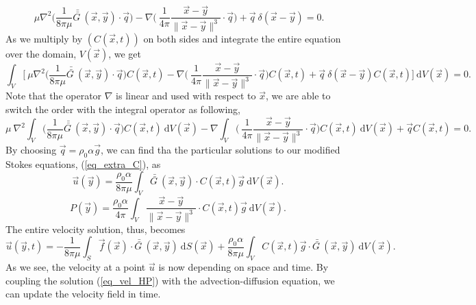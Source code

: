 \begin{equation}
	\ \mu \nabla^2 
	\biggl( \frac{1}{8\pi \mu}  \bar{\bar{G \ }}(\vec{x}, \vec{y})
	\cdot  \vec{q} \biggr)
	- \nabla \biggl(\ \frac{1}{4\pi }  
	\frac{\vec{x} - \vec{y}}{\| \vec{x} - \vec{y}\|^3}
	\cdot  \vec{q} \biggr)
	+ \vec{q} \ \delta \left(\vec{x} - \vec{y} \right)
	=0 .
\label{eq_single_stokes_sub}
\end{equation}
As we multiply by $\left( C(\vec{x}, t) \right)$ on both sides and integrate the entire equation over the domain, $V(\vec{x})$, we get
\begin{equation}
	\int_{V}
	\biggl[
	\ \mu \nabla^2 
	\biggl( \frac{1}{8\pi \mu}  \bar{\bar{G \ }}(\vec{x}, \vec{y})
	\cdot  \vec{q} \biggr)
	C(\vec{x}, t)
	-
	\nabla \biggl(\ \frac{1}{4\pi }  
	\frac{\vec{x} - \vec{y}}{\| \vec{x} - \vec{y}\|^3}
	\cdot  \vec{q} \biggr)
	C(\vec{x}, t)
	+ \vec{q} \ \delta \left(\vec{x} - \vec{y} \right)
	C(\vec{x}, t)
	\biggr]
	\ \textrm{d}V(\vec{x}) = 0 .
\label{eq_single_stokes_sub2}
\end{equation}
Note that the operator $\nabla$ is linear and used with respect to $\vec{x}$, we are able to switch the order with the integral operator as following,
\begin{equation}
	\mu \ \nabla^2 
	\int_{V}
	\biggl( \frac{1}{8\pi \mu}  \bar{\bar{G \ }}(\vec{x}, \vec{y})
	\cdot  \vec{q} \biggr)
	C(\vec{x}, t)
	\ \textrm{d}V(\vec{x})
	-
	\nabla 
	\int_{V}
	\biggl(\ \frac{1}{4\pi }  
	\frac{\vec{x} - \vec{y}}{\| \vec{x} - \vec{y}\|^3}
	\cdot  \vec{q} \biggr)
	C(\vec{x}, t)
	\ \textrm{d}V(\vec{x})
	+\vec{q} C(\vec{x}, t) = 0 .
\label{eq_single_stokes_sub3}
\end{equation}
By choosing $\vec{q} = \rho_0 \alpha \vec{g}$, we can find
tha the particular solutions to our modified Stokes equations, (\ref{eq_extra_C}), as
\begin{equation}
	\vec{u} (\vec{y}) =
	 \frac{\rho_0 \alpha }{8\pi \mu}
	\int_{V}  \bar{\bar{G \ }}(\vec{x}, \vec{y})
	\cdot  C(\vec{x}, t) \vec{g} 
	\ \textrm{d}V(\vec{x}).
\label{eq_fund_soln_unit}
\end{equation}
\begin{equation}
	P(\vec{y}) = 
	\frac{\rho_0 \alpha }{4\pi }  
	\int_{V}
	\frac{\vec{x} - \vec{y}}{\| \vec{x} - \vec{y}\|^3}
	\cdot 
	C(\vec{x}, t) \vec{g} 
	\ \textrm{d}V(\vec{x}).
\label{eq_fund_soln_p}
\end{equation}
The entire velocity solution, thus, becomes
\begin{equation}
	 \vec{u} \left(\vec{y}, t \right) =
	 - \frac{1}{8 \pi \mu} \int_{S}  
		 \vec{f}(\vec{x}) 
		 \cdot \bar{\bar{G \ }} (\vec{x},\vec{y}) 
		 \ \textrm{d}S(\vec{x})
	+ \frac{ \rho_0 \alpha  }{8\pi \mu} \int_V  C \left(\vec{x},  t \right) \vec{g} \cdot 
	\bar{\bar{G \ }}(\vec{x}, \vec{y} ) 
	\ \text{d}V(\vec{x}).
\label{eq_vel_HP}
\end{equation}
As we see, the velocity at a point $\vec{u}$ is now depending on space and time. By coupling the solution (\ref{eq_vel_HP}) with the advection-diffusion equation, we can update the velocity field in time. 


